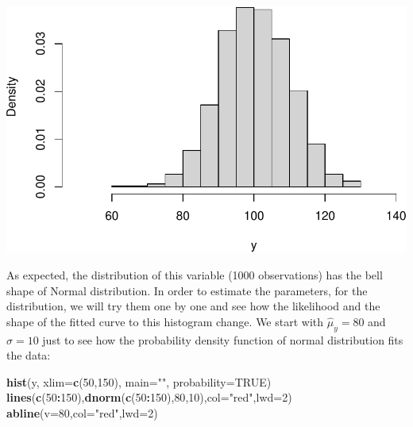 \documentclass[
]{book}
\newenvironment{Shaded}{\begin{snugshade}}{\end{snugshade}}
\newcommand{\DataTypeTok}[1]{\textcolor[rgb]{0.13,0.29,0.53}{#1}}
\newcommand{\DecValTok}[1]{\textcolor[rgb]{0.00,0.00,0.81}{#1}}
\newcommand{\KeywordTok}[1]{\textcolor[rgb]{0.13,0.29,0.53}{\textbf{#1}}}
\newcommand{\NormalTok}[1]{#1}
\newcommand{\OperatorTok}[1]{\textcolor[rgb]{0.81,0.36,0.00}{\textbf{#1}}}
\newcommand{\OtherTok}[1]{\textcolor[rgb]{0.56,0.35,0.01}{#1}}
\newcommand{\StringTok}[1]{\textcolor[rgb]{0.31,0.60,0.02}{#1}}
\theoremstyle{definition}
\theoremstyle{definition}
\theoremstyle{definition}
\theoremstyle{definition}
\theoremstyle{remark}
\begin{document}
\includegraphics{Svetunkov---Statistics-for-Business-Analytics_files/figure-latex/unnamed-chunk-102-1.pdf}

As expected, the distribution of this variable (1000 observations) has the bell shape of Normal distribution. In order to estimate the parameters, for the distribution, we will try them one by one and see how the likelihood and the shape of the fitted curve to this histogram change. We start with \(\hat{\mu}_y=80\) and \(\hat{\sigma}=10\) just to see how the probability density function of normal distribution fits the data:

\begin{Shaded}
\begin{Highlighting}[]
\KeywordTok{hist}\NormalTok{(y, }\DataTypeTok{xlim=}\KeywordTok{c}\NormalTok{(}\DecValTok{50}\NormalTok{,}\DecValTok{150}\NormalTok{), }\DataTypeTok{main=}\StringTok{""}\NormalTok{, }\DataTypeTok{probability=}\OtherTok{TRUE}\NormalTok{)}
\KeywordTok{lines}\NormalTok{(}\KeywordTok{c}\NormalTok{(}\DecValTok{50}\OperatorTok{:}\DecValTok{150}\NormalTok{),}\KeywordTok{dnorm}\NormalTok{(}\KeywordTok{c}\NormalTok{(}\DecValTok{50}\OperatorTok{:}\DecValTok{150}\NormalTok{),}\DecValTok{80}\NormalTok{,}\DecValTok{10}\NormalTok{),}\DataTypeTok{col=}\StringTok{"red"}\NormalTok{,}\DataTypeTok{lwd=}\DecValTok{2}\NormalTok{)}
\KeywordTok{abline}\NormalTok{(}\DataTypeTok{v=}\DecValTok{80}\NormalTok{,}\DataTypeTok{col=}\StringTok{"red"}\NormalTok{,}\DataTypeTok{lwd=}\DecValTok{2}\NormalTok{)}
\end{Highlighting}
\end{Shaded}
\end{document}
